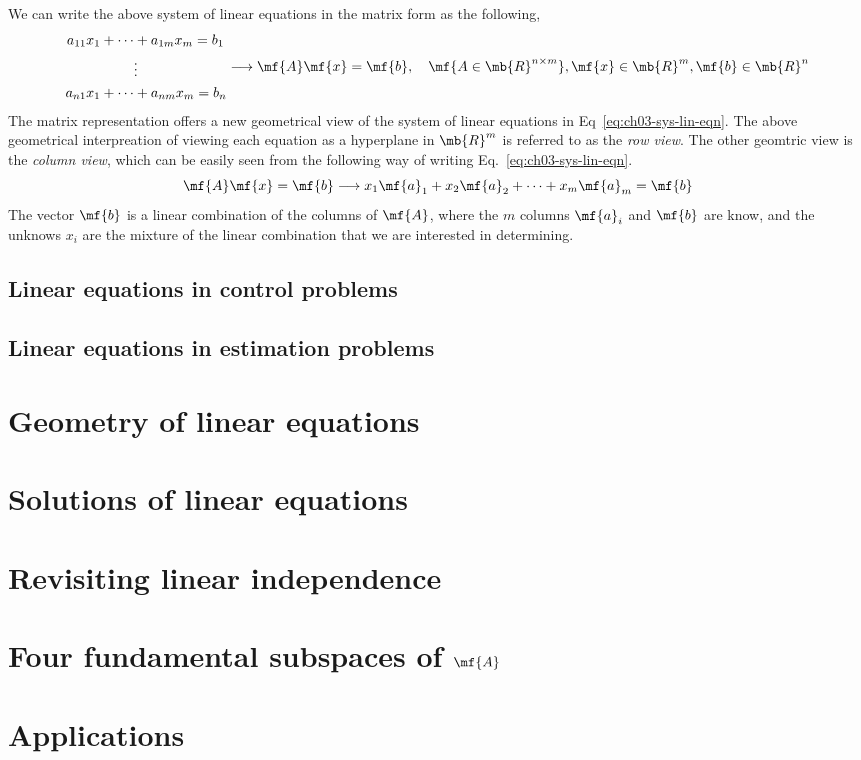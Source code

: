 We can write the above system of linear equations in the matrix form as the following,
\begin{equation}
    \begin{split}
        a_{11}x_1 + \cdots& + a_{1m}x_m = b_1\\
        &\vdots\\
        a_{n1}x_1 + \cdots& + a_{nm}x_m = b_n
    \end{split} \longrightarrow \mf{A}\mf{x} = \mf{b}, \quad \mf{A \in \mb{R}^{n \times m}}, \mf{x} \in \mb{R}^m, \mf{b} \in \mb{R}^n
\end{equation}
The matrix representation offers a new geometrical view of the system of linear equations in Eq~\ref{eq:ch03-sys-lin-eqn}. The above geometrical interpreation of viewing each equation as a hyperplane in $\mb{R}^m$ is referred to as the \textit{row view}. The other geomtric view is the \textit{column view}, which can be easily seen from the following way of writing Eq.~\ref{eq:ch03-sys-lin-eqn}.
\begin{equation}
    \mf{A}\mf{x} = \mf{b} \longrightarrow x_1\mf{a}_1 + x_2\mf{a}_2 + \cdots + x_m \mf{a}_m = \mf{b}
\end{equation}
The vector $\mf{b}$ is a linear combination of the columns of $\mf{A}$, where the $m$ columns $\mf{a}_i$ and $\mf{b}$ are know, and the unknows $x_i$ are the mixture of the linear combination that we are interested in determining.



\subsection{Linear equations in control problems}


\subsection{Linear equations in estimation problems}


\section{Geometry of linear equations}


\section{Solutions of linear equations}


\section{Revisiting linear independence}

\section{Four fundamental subspaces of $\mf{A}$}


\section{Applications}